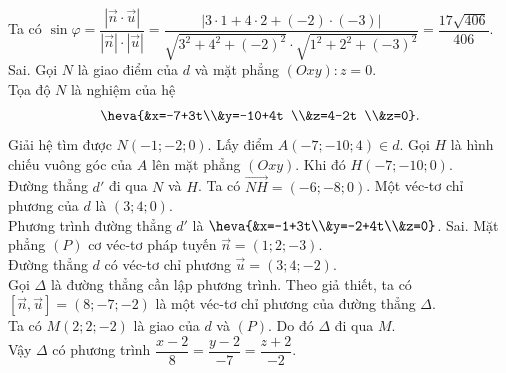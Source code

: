 \begin{ex}
{\begin{itemchoice}
			Ta có $\sin\varphi=\dfrac{|\overrightarrow{n}\cdot \overrightarrow{u}|}{|\overrightarrow{n}|\cdot |\overrightarrow{u}|}=\dfrac{|3\cdot 1+4\cdot 2+(-2)\cdot (-3)|}{\sqrt{3^2+4^2+(-2)^2}\cdot \sqrt{1^2+2^2+(-3)^2}}=\dfrac{17\sqrt{406}}{406}$.
			\itemch Sai. Gọi $N$ là giao điểm của $d$ và mặt phẳng $(Oxy)\colon z=0$.\\
			 Tọa độ $N$ là nghiệm của hệ 
			$$\heva{&x=-7+3t\\&y=-10+4t \\&z=4-2t \\&z=0}.$$
			Giải hệ tìm được $N(-1; -2; 0)$. Lấy điểm $A(-7; -10; 4)\in d$. Gọi $H$ là hình chiếu vuông góc của $A$ lên mặt phẳng $(Oxy)$. Khi đó $H(-7; -10; 0)$.\\
			Đường thẳng $d'$ đi qua $N$ và $H$. Ta có $\overrightarrow{NH}=(-6; -8; 0)$. Một véc-tơ chỉ phương của $d$ là $(3; 4; 0)$.\\
			Phương trình đường thẳng $d'$ là $\heva{&x=-1+3t\\&y=-2+4t\\&z=0}$.
			\itemch Sai. Mặt phẳng $(P)$ cơ véc-tơ pháp tuyến $\overrightarrow{n}=(1;2;-3)$.\\
			Đường thẳng $d$ có véc-tơ chỉ phương $\overrightarrow{u}=(3;4;-2)$.\\
			Gọi $\Delta$ là đường thẳng cần lập phương trình. Theo giả thiết, ta có $[\overrightarrow{n},\overrightarrow{u}]=(8;-7;-2)$ là một véc-tơ chỉ phương của đường thẳng $\Delta$.\\
			Ta có $M(2; 2; -2)$ là giao của $d$ và $(P)$. Do đó $\Delta$ đi qua $M$.\\
			Vậy $\Delta$ có phương trình $\dfrac{x-2}{8}=\dfrac{y-2}{-7}=\dfrac{z+2}{-2}$.
		\end{itemchoice}
	}
\end{ex}


